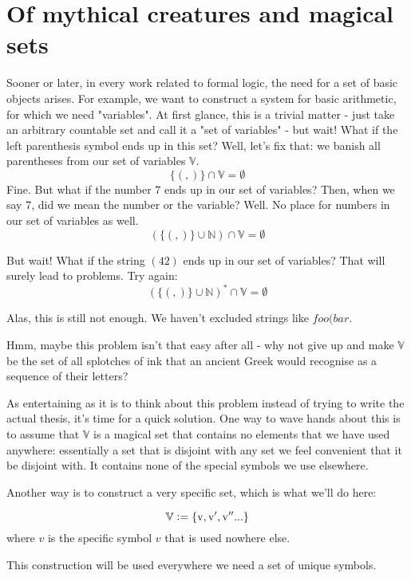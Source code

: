 \documentclass[main.tex]{subfiles}
\begin{document}
\section{Of mythical creatures and magical sets}
\label{sec:magic}

Sooner or later, in every work related to formal logic, the need for
a set of basic objects arises. For example, we want to construct a system for basic
arithmetic, for which we need "variables".
At first glance, this is a trivial matter - just take an arbitrary countable
set and call it a "set of variables" - but wait! What if the left parenthesis
symbol ends up in this set? Well, let's fix that: we banish all parentheses
from our set of variables $\mathbb{V}$.
\[ \{ (, ) \} \cap \mathbb{V} = \emptyset \]
Fine. But what if the number $7$ ends up in our set of variables? Then,
when we say 7, did we mean the number or the variable? Well. No place for
numbers in our set of variables as well.
\[ ( \{ (, ) \} \cup \mathbb{N} ) \cap \mathbb{V} = \emptyset \]

But wait! What if the string $(42)$ ends up in our set of variables? That will
surely lead to problems. Try again:
\[ ( \{ (, ) \} \cup \mathbb{N} )^* \cap \mathbb{V} = \emptyset \]

Alas, this is still not enough. We haven't excluded strings like $foo(bar$.

Hmm, maybe this problem isn't that easy after all - why not give up and make
$\mathbb{V}$ be the set of all splotches of ink that an ancient Greek would
recognise as a sequence of their letters?

As entertaining as it is to think about this problem instead of trying to write
the actual thesis, it's time for a quick solution. One way to wave hands
about this is to assume that $\mathbb{V}$ is a magical set that contains
no elements that we have used anywhere: essentially a set that is disjoint
with any set we feel convenient that it be disjoint with. It contains none of
the special symbols we use elsewhere.

Another way is to construct a very specific set, which is what we'll do here:

\[ \mathbb{V} \vcentcolon= \{ \mathrm{v}, \mathrm{v'}, \mathrm{v''} ... \} \]
where $v$ is the specific symbol $v$ that is used nowhere else.

This construction will be used everywhere we need a set of unique symbols.
\end{document}
